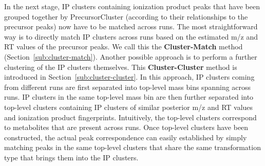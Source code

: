 In the next stage, IP clusters containing ionization product peaks that have been grouped together by PrecursorCluster (according to their relationships to the precursor peaks) now have to be matched across runs. The most straightforward way is to directly match IP clusters across runs based on the estimated m/z and RT values of the precursor peaks. We call this the \textbf{Cluster-Match} method (Section~\ref{sub:cluster-match}). Another possible approach is to perform a further clustering of the IP clusters themselves. This \textbf{Cluster-Cluster} method is introduced in Section~\ref{sub:cluster-cluster}. In this approach, IP clusters coming from different runs are first separated into top-level mass bins spanning across runs. IP clusters in the same top-level mass bin are then further separated into top-level clusters containing IP clusters of similar posterior m/z and RT values and ionization product fingerprints. Intuitively, the top-level clusters correspond to metabolites that are present across runs. Once top-level clusters have been constructed, the actual peak correspondence can easily established by simply matching peaks in the same top-level clusters that share the same transformation type that brings them into the IP clusters.

